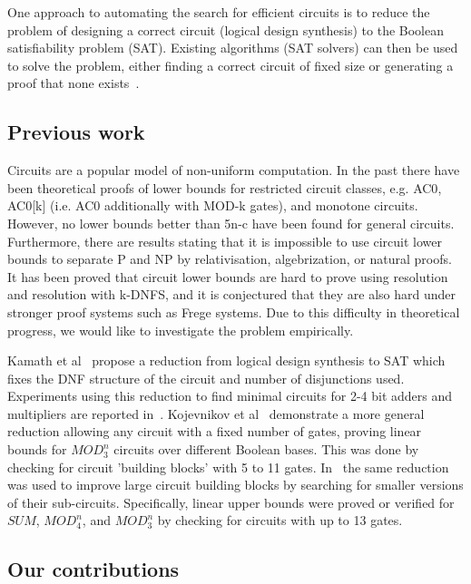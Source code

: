 \documentclass{article}
\begin{document}
One approach to automating the search for efficient circuits is to reduce the problem of designing a correct circuit (logical design synthesis) to the Boolean satisfiability problem (SAT). Existing algorithms (SAT solvers) can then be used to solve the problem, either finding a correct circuit of fixed size or generating a proof that none exists~\cite{kulikov}.

\subsection{Previous work}

Circuits are a popular model of non-uniform computation. In the past there have been theoretical proofs of lower bounds for restricted circuit classes, e.g. AC0\cite{furst81}\cite{ajtai83}, AC0[k] (i.e. AC0 additionally with MOD-k gates)\cite{razborov87}\cite{smolensky87}, and monotone circuits\cite{razborov85}. However, no lower bounds better than 5n-c\cite{iwama02} have been found for general circuits. Furthermore, there are results stating that it is impossible to use circuit lower bounds to separate P and NP by relativisation\cite{baker75}, algebrization\cite{aaronson09}, or natural proofs\cite{razborov94}. It has been proved that circuit lower bounds are hard to prove using resolution and resolution with k-DNFS, and it is conjectured that they are also hard under stronger proof systems such as Frege systems\cite{raz}. Due to this difficulty in theoretical progress, we would like to investigate the problem empirically.

Kamath et al~\cite{kamath} propose a reduction from logical design synthesis to SAT which fixes the DNF structure of the circuit and number of disjunctions used. Experiments using this reduction to find minimal circuits for 2-4 bit adders and multipliers are reported in~\cite{estrada}. Kojevnikov et al~\cite{kulikov} demonstrate a more general reduction allowing any circuit with a fixed number of gates, proving linear bounds for \(MOD^n_3\) circuits over different Boolean bases. This was done by checking for circuit 'building blocks' with 5 to 11 gates. In~\cite{kulikovlocal} the same reduction was used to improve large circuit building blocks by searching for smaller versions of their sub-circuits. Specifically, linear upper bounds were proved or verified for \(SUM\), \(MOD^n_4\), and \(MOD^n_3\) by checking for circuits with up to 13 gates.

\subsection{Our contributions}
\end{document}
